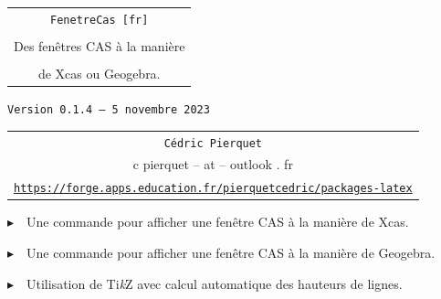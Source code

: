 \documentclass[french,a4paper,11pt]{article}
\def\TPversion{0.1.4}
\def\TPdate{5 novembre 2023}
\providecommand\tikzlogo{Ti\textit{k}Z}
\let\TikZ\tikzlogo
\begin{document}
\setlength{\aweboxleftmargin}{0.07\linewidth}
\setlength{\aweboxcontentwidth}{0.93\linewidth}
\setlength{\aweboxvskip}{8pt}

\pagestyle{fancy}

\thispagestyle{empty}

\vspace{2cm}

\begin{center}
	\begin{minipage}{0.75\linewidth}
	\begin{tcolorbox}[colframe=yellow,colback=yellow!15]
		\begin{center}
			\begin{tabular}{c}
				{\Huge \texttt{FenetreCas [fr]}}\\
				\\
				{\LARGE Des fenêtres CAS à la manière} \\
				\\
				{\LARGE de Xcas ou Geogebra.} \\
			\end{tabular}
			
			\bigskip
			
			{\small \texttt{Version \TPversion{} -- \TPdate}}
		\end{center}
	\end{tcolorbox}
\end{minipage}
\end{center}

\begin{center}
	\begin{tabular}{c}
	\texttt{Cédric Pierquet}\\
	{\ttfamily c pierquet -- at -- outlook . fr}\\
	\texttt{\url{https://forge.apps.education.fr/pierquetcedric/packages-latex}}
\end{tabular}
\end{center}

\vspace{0.25cm}

{$\blacktriangleright$~~Une commande pour afficher une fenêtre CAS à la manière de \textsf{Xcas}.}

\smallskip

{$\blacktriangleright$~~Une commande pour afficher une fenêtre CAS à la manière de \textsf{Geogebra}.}

\smallskip

{$\blacktriangleright$~~Utilisation de \TikZ{} avec calcul automatique des hauteurs de lignes.}
\end{document}
